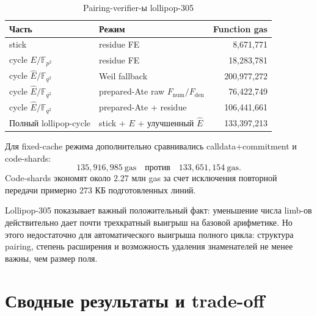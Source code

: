 \documentclass[12pt,a4paper]{article}
\newcommand{\Gas}{\mathrm{gas}}
\begin{document}
\begin{table}[htbp]
\centering
\caption{Pairing-verifier-ы lollipop-305}
\small
\begin{tabularx}{\linewidth}{Y Y r}
\toprule
Часть & Режим & Function gas \\
\midrule
stick & residue FE & 8,671,771 \\
cycle $E/\mathbb{F}_{p^2}$ & residue FE & 18,283,781 \\
cycle $\widehat{E}/\mathbb{F}_{q^2}$ & Weil fallback & 200,977,272 \\
cycle $\widehat{E}/\mathbb{F}_{q^2}$ & prepared-Ate raw $F_{\mathrm{num}}/F_{\mathrm{den}}$ & 76,422,749 \\
cycle $\widehat{E}/\mathbb{F}_{q^2}$ & prepared-Ate + residue & 106,441,661 \\
\midrule
Полный lollipop-cycle & stick + $E$ + улучшенный $\widehat{E}$ & 133,397,213 \\
\bottomrule
\end{tabularx}
\end{table}

Для fixed-cache режима дополнительно сравнивались calldata+commitment и
code-shards:
\[
    135{,}916{,}985\ \Gas
    \quad\text{против}\quad
    133{,}651{,}154\ \Gas.
\]
Code-shards экономят около $2.27$ млн gas за счет исключения повторной передачи
примерно $273$ КБ подготовленных линий.

Lollipop-305 показывает важный положительный факт: уменьшение числа limb-ов
действительно дает почти трехкратный выигрыш на базовой арифметике. Но этого
недостаточно для автоматического выигрыша полного цикла: структура pairing,
степень расширения и возможность удаления знаменателей не менее важны, чем
размер поля.

\section{Сводные результаты и trade-off}
\end{document}
